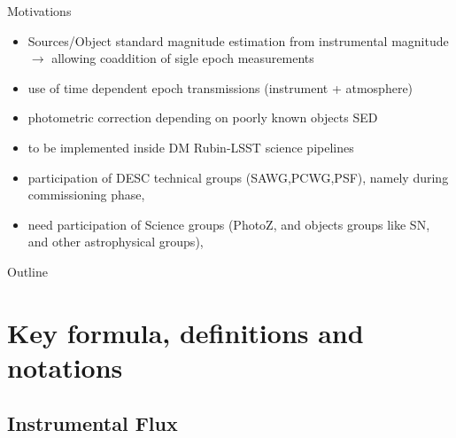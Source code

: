 \documentclass{beamer}
\begin{document}
\begin{frame}{Motivations}
\begin{itemize}
\item Sources/Object standard magnitude estimation from instrumental magnitude $\rightarrow$ allowing coaddition of sigle epoch measurements
\item use of time dependent epoch transmissions (instrument + atmosphere)
\item photometric correction depending on poorly known objects SED
\item to be implemented inside DM Rubin-LSST science pipelines 
\item participation of DESC technical groups (SAWG,PCWG,PSF), namely during commissioning phase,
\item need participation of Science groups (PhotoZ, and objects groups like SN, and other astrophysical groups),
\end{itemize}
\end{frame}

\begin{frame}{Outline}
  \tableofcontents
\end{frame}




\section{Key formula, definitions and notations}
\subsection{Instrumental Flux}
\end{document}
